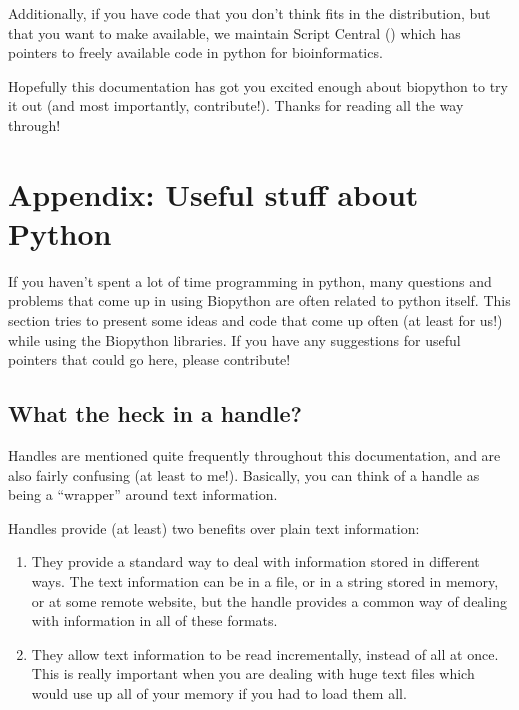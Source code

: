 \documentclass{report}
\begin{document}
Additionally, if you have code that you don't think fits in the
distribution, but that you want to make available, we maintain Script
Central () 
which has pointers to freely available code in python for bioinformatics.


Hopefully this documentation has got you excited enough about
biopython to try it out (and most importantly, contribute!). Thanks
for reading all the way through!

\chapter{Appendix: Useful stuff about Python}
\label{sec:appendix}

If you haven't spent a lot of time programming in python, many
questions and problems that come up in using Biopython are often
related to python itself. This section tries to present some ideas and 
code that come up often (at least for us!) while using the Biopython
libraries. If you have any suggestions for useful pointers that could
go here, please contribute!

\section{What the heck in a handle?}
\label{sec:appendix-handles}

Handles are mentioned quite frequently throughout this documentation,
and are also fairly confusing (at least to me!). Basically, you can
think of a handle as being a ``wrapper'' around text information.


Handles provide (at least) two benefits over plain text information:

\begin{enumerate}
  \item They provide a standard way to deal with information stored in 
  different ways. The text information can be in a file, or in a
  string stored in memory, or at some remote website, but the handle
  provides a common way of dealing with information in all of these
  formats. 

  \item They allow text information to be read incrementally, instead
  of all at once. This is really important when you are dealing with
  huge text files which would use up all of your memory if you had to
  load them all.
\end{enumerate}
\end{document}
